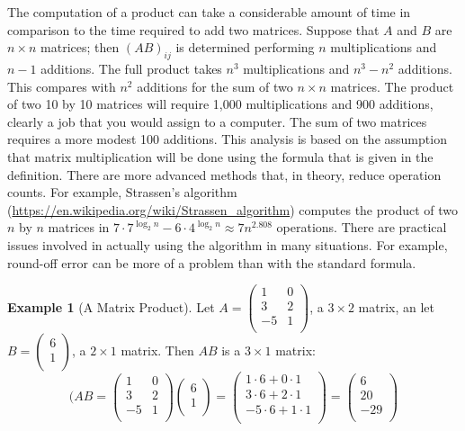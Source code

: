 \documentclass[10pt,]{book}
\theoremstyle{plain}
\theoremstyle{definition}
\theoremstyle{definition}
\theoremstyle{definition}
\newtheorem{example}[theorem]{Example}
\theoremstyle{definition}
\begin{document}
\par
The computation of a product 
can take a considerable amount of time in comparison to the time required to add two matrices. Suppose that \(A\) and \(B\) are \(n\times n\) matrices; then \((A B)_{ij}\) is determined performing \(n\) multiplications and \(n-1\) additions. The full product takes \(n^3\) multiplications and \(n^3 - n^2\) additions. This compares with \(n^2\) additions for the sum of two \(n\times n\) matrices. The product of two 10 by 10 matrices will require 1,000 multiplications and 900 additions, clearly a job that you would assign to a computer. The sum of two matrices requires a more modest 100 additions. This analysis is based on the assumption that matrix multiplication will be done using the formula that is given in the definition. There are more advanced methods that, in theory, reduce operation counts. For example, Strassen's algorithm (\href{https://en.wikipedia.org/wiki/Strassen_algorithm}{https://en.wikipedia.org/wiki/Strassen\_algorithm}) computes the product of two \(n\) by \(n\) matrices in \(7\cdot 7^{\log _2n}-6\cdot  4^{\log _2n}\approx  7 n^{2.808}\) operations. There are practical issues involved in actually using the algorithm in many situations.  For example, round-off error can be more of a problem than with the standard formula. %
\begin{example}[A Matrix Product]\label{ex-matrix-product}
  Let \(A =\left(
\begin{array}{cc}
 1 & 0 \\
 3 & 2 \\
 -5 & 1 \\
\end{array}
\right)\), a \(3\times 2\) matrix, an let \(B =\left(
\begin{array}{c}
 6 \\
 1 \\
\end{array}
\right)\), a \(2\times 1\) matrix. Then \(A B\) is a \(3 \times  1\) matrix:
\begin{equation*}(A B = \left(
\begin{array}{cc}
 1 & 0 \\
 3 & 2 \\
 -5 & 1 \\
\end{array}
\right) \left(
\begin{array}{c}
 6 \\
 1 \\
\end{array}
\right) = \left(
\begin{array}{c}
 1\cdot 6+0\cdot 1 \\
 3 \cdot 6 + 2\cdot 1 \\
 -5 \cdot 6 + 1\cdot 1 \\
\end{array}
\right) = \left(
\begin{array}{c}
 6 \\
 20 \\
 -29 \\
\end{array}
\right)\end{equation*}
%
\end{example}
\end{document}
